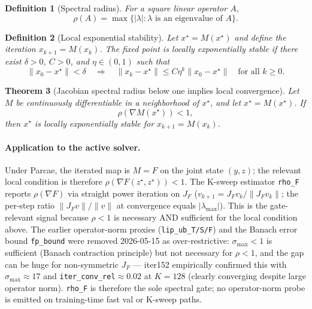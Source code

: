 \documentclass[11pt]{article}
\newtheorem{theorem}{Theorem}[section]
\newtheorem{definition}[theorem]{Definition}
\begin{document}
\begin{definition}[Spectral radius]
For a square linear operator $A$,
\[
  \rho(A)=\max\{|\lambda|:\lambda \text{ is an eigenvalue of } A\}.
\]
\end{definition}

\begin{definition}[Local exponential stability]
Let $x^\star=M(x^\star)$ and define the iteration $x_{k+1}=M(x_k)$.  The
fixed point is locally exponentially stable if there exist $\delta>0$,
$C>0$, and $\eta\in(0,1)$ such that
\[
  \|x_0-x^\star\|<\delta
  \quad\Longrightarrow\quad
  \|x_k-x^\star\|\le C\eta^k\|x_0-x^\star\|
  \quad\text{for all }k\ge0.
\]
\end{definition}

\begin{theorem}[Jacobian spectral radius below one implies local convergence]
\label{thm:lyap_main}
Let $M$ be continuously differentiable in a neighborhood of $x^\star$,
and let $x^\star=M(x^\star)$.  If
\[
  \rho\!\left(\nabla M(x^\star)\right)<1,
\]
then $x^\star$ is locally exponentially stable for $x_{k+1}=M(x_k)$.
\end{theorem}

\paragraph{Application to the active solver.}
Under Parcae, the iterated map is $M=F$ on the joint state $(y, z)$;
the relevant local condition is therefore
$\rho(\nabla F(z^\star,z^\star))<1$.  The K-sweep estimator
\texttt{rho\_F} reports $\rho(\nabla F)$ via straight power iteration on
$J_F$ (\(v_{k+1}=J_F v_k/\|J_F v_k\|\); the per-step ratio
\(\|J_F v\|/\|v\|\) at convergence equals $|\lambda_{\max}|$).  This
is the gate-relevant signal because $\rho<1$ is necessary AND sufficient
for the local condition above.  The earlier operator-norm proxies
(\texttt{lip\_ub\_T/S/F}) and the Banach error bound \texttt{fp\_bound}
were removed 2026-05-15 as over-restrictive: $\sigma_{\max}<1$ is
sufficient (Banach contraction principle) but not necessary for $\rho<1$,
and the gap can be huge for non-symmetric $J_F$ — iter152 empirically
confirmed this with $\sigma_{\max}\approx 17$ and
\texttt{iter\_conv\_rel}$\approx 0.02$ at $K=128$ (clearly converging
despite large operator norm).  \texttt{rho\_F} is therefore the sole
spectral gate; no operator-norm probe is emitted on training-time fast
val or K-sweep paths.
\end{document}
